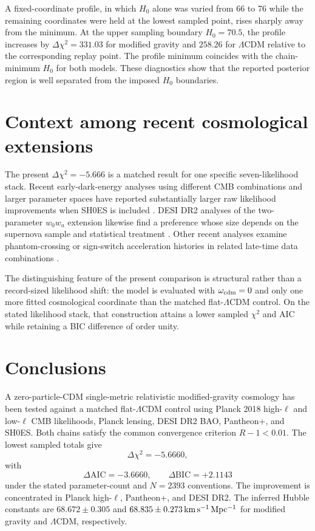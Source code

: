 \documentclass[aps,prd,twocolumn,superscriptaddress,nofootinbib,longbibliography,floatfix]{revtex4-2}
\newcommand{\LCDM}{\Lambda\mathrm{CDM}}
\begin{document}
A fixed-coordinate profile, in which $H_0$ alone was varied from 66 to 76 while the remaining coordinates were held at the lowest sampled point, rises sharply away from the minimum. At the upper sampling boundary $H_0=70.5$, the profile increases by $\Delta\chi^2=331.03$ for modified gravity and $258.26$ for $\LCDM$ relative to the corresponding replay point. The profile minimum coincides with the chain-minimum $H_0$ for both models. These diagnostics show that the reported posterior region is well separated from the imposed $H_0$ boundaries.

\section{Context among recent cosmological extensions}\label{sec:context}
The present $\Delta\chi^2=-5.666$ is a matched result for one specific seven-likelihood stack. Recent early-dark-energy analyses using different CMB combinations and larger parameter spaces have reported substantially larger raw likelihood improvements when SH0ES is included \cite{Poulin2025EDE}. DESI DR2 analyses of the two-parameter $w_0w_a$ extension likewise find a preference whose size depends on the supernova sample and statistical treatment \cite{DESIDR2II2025,DESIDR2Extended2025,Ormondroyd2025,WangMota2025}. Other recent analyses examine phantom-crossing or sign-switch acceleration histories in related late-time data combinations \cite{Pang2025DDE,Dixit2026SignSwitch}.

The distinguishing feature of the present comparison is structural rather than a record-sized likelihood shift: the model is evaluated with $\omega_{\rm cdm}=0$ and only one more fitted cosmological coordinate than the matched flat-$\LCDM$ control. On the stated likelihood stack, that construction attains a lower sampled $\chi^2$ and AIC while retaining a BIC difference of order unity.

\section{Conclusions}\label{sec:conclusion}
A zero-particle-CDM single-metric relativistic modified-gravity cosmology has been tested against a matched flat-$\LCDM$ control using Planck 2018 high-$\ell$ and low-$\ell$ CMB likelihoods, Planck lensing, DESI DR2 BAO, Pantheon+, and SH0ES. Both chains satisfy the common convergence criterion $R-1<0.01$. The lowest sampled totals give
\begin{equation}
\Delta\chi^2=-5.6660,
\end{equation}
with
\begin{equation}
\Delta\mathrm{AIC}=-3.6660,\qquad \Delta\mathrm{BIC}=+2.1143
\end{equation}
under the stated parameter-count and $N=2393$ conventions. The improvement is concentrated in Planck high-$\ell$, Pantheon+, and DESI DR2. The inferred Hubble constants are $68.672\pm0.305$ and $68.835\pm0.273\,{\rm km\,s^{-1}\,Mpc^{-1}}$ for modified gravity and $\LCDM$, respectively.
\end{document}
